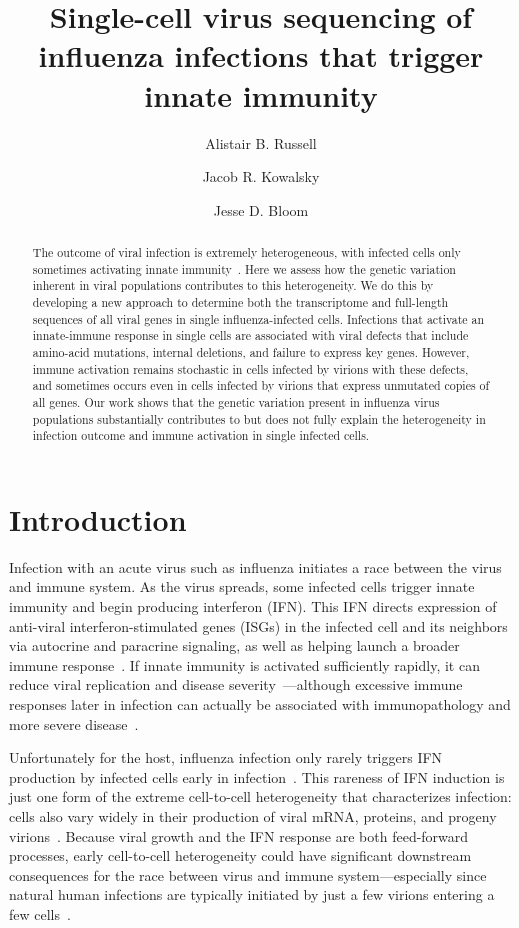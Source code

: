 \documentclass[9pt,lineno]{elife}
\title{Single-cell virus sequencing of influenza infections that trigger innate immunity}
\author[1]{Alistair B. Russell}
\author[1]{Jacob R. Kowalsky}
\author[1,2,3*]{Jesse D. Bloom}
\affil[1]{Basic Sciences Division and Computational Biology Program, Fred Hutchinson Cancer Research Center, Seattle, United States}
\affil[2]{Department of Genome Sciences, University of Washington, Seattle, United States}
\affil[3]{Howard Hughes Medical Institute, Fred Hutchinson Cancer Research Center, Seattle, United States}
\begin{document}
\maketitle

\begin{abstract}
The outcome of viral infection is extremely heterogeneous, with infected cells only sometimes activating innate immunity~\citep{russell2018extreme}.  
Here we assess how the genetic variation inherent in viral populations contributes to this heterogeneity.
We do this by developing a new approach to determine both the transcriptome and full-length sequences of all viral genes in single influenza-infected cells.
Infections that activate an innate-immune response in single cells are associated with viral defects that include amino-acid mutations, internal deletions, and failure to express key genes.  
However, immune activation remains stochastic in cells infected by virions with these defects, and sometimes occurs even in cells infected by virions that express unmutated copies of all genes.
Our work shows that the genetic variation present in influenza virus populations substantially contributes to but does not fully explain the heterogeneity in infection outcome and immune activation in single infected cells.
\end{abstract}


\section{Introduction}
Infection with an acute virus such as influenza initiates a race between the virus and immune system.
As the virus spreads, some infected cells trigger innate immunity and begin producing interferon (IFN).
This IFN directs expression of anti-viral interferon-stimulated genes (ISGs) in the infected cell and its neighbors via autocrine and paracrine signaling, as well as helping launch a broader immune response~\citep{stetson2006type,honda2006type}.
If innate immunity is activated sufficiently rapidly, it can reduce viral replication and disease severity~\citep{solov1969results,treanor1987intranasally,beilharz2007protection,kugel2009intranasal,steel2010transmission}---although excessive immune responses later in infection can actually be associated with immunopathology and more severe disease~\citep{la2007question, iwasaki2014innate}.

Unfortunately for the host, influenza infection only rarely triggers IFN production by infected cells early in infection~\citep{kallfass2013visualizing, killip2017single}.
This rareness of IFN induction is just one form of the extreme cell-to-cell heterogeneity that characterizes infection: cells also vary widely in their production of viral mRNA, proteins, and progeny virions~\citep{russell2018extreme,steuerman2018dissection,sjaastad2018distinct,heldt2015single}.
Because viral growth and the IFN response are both feed-forward processes, early cell-to-cell heterogeneity could have significant downstream consequences for the race between virus and immune system---especially since natural human infections are typically initiated by just a few virions entering a few cells~\citep{mccrone2018stochastic, xue2018reconciling, varble2014influenza}.
\end{document}
